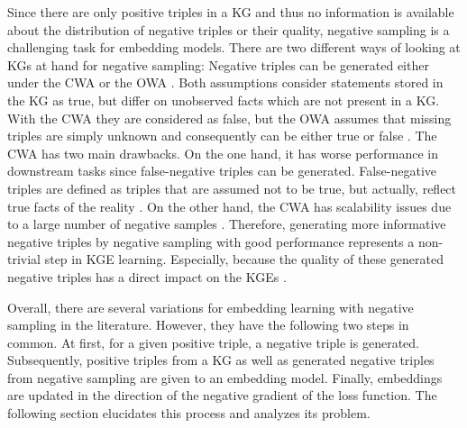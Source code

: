 Since there are only positive triples in a \ac{KG} and thus no information is available about the distribution of negative triples or their quality, negative sampling is a challenging task for embedding models.
There are two different ways of looking at \acp{KG} at hand for negative sampling:
Negative triples can be generated either under the \ac{CWA} or the \ac{OWA} \cite{qiannegative}.
Both assumptions consider statements stored in the \ac{KG} as true, but differ on unobserved facts which are not present in a \ac{KG}.
With the \ac{CWA} they are considered as false, but the \ac{OWA} assumes that missing triples are simply unknown and consequently can be either true or false
\cite{qiannegative}.
The \ac{CWA} has two main drawbacks.
On the one hand, it has worse performance in downstream tasks \cite{qiannegative} since false-negative triples can be generated.
False-negative triples are defined as triples that are assumed not to be true, but actually, reflect true facts of the reality \cite{qianunderstanding}.
On the other hand, the \ac{CWA} has scalability issues due to a large number of negative samples \cite{qiannegative}.
Therefore, generating more informative negative triples by negative sampling with good performance represents a non-trivial step in \ac{KGE} learning.
Especially, because the quality of these generated negative triples has a direct impact on the \acp{KGE} \cite{qiannegative}.

Overall, there are several variations for embedding learning with negative sampling in the literature.
However, they have the following two steps in common.
At first, for a given positive triple, a negative triple is generated.
Subsequently, positive triples from a \ac{KG} as well as generated negative triples from negative sampling are given to an embedding model.
Finally, embeddings are updated in the direction of the negative gradient of the loss function.
The following section elucidates this process and analyzes its problem.